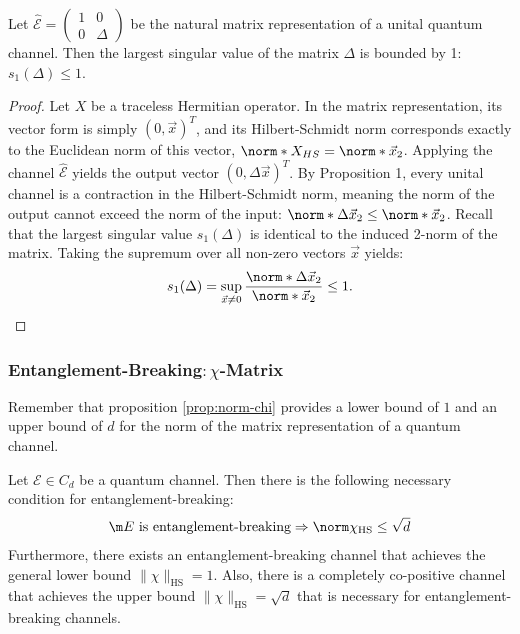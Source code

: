 \begin{prop}
Let $\hat{\mathcal{E}} = \begin{pmatrix} 1 & 0 \\ 0 & \Delta \end{pmatrix}$ be the natural matrix representation of a unital quantum channel. Then the largest singular value of the matrix $\Delta$ is bounded by 1: $s_1(\Delta) \leq 1$.
\end{prop}
\begin{proof}
Let $X$ be a traceless Hermitian operator. In the matrix representation, its vector form is simply $(0, \vec{x})^T$, and its Hilbert-Schmidt norm corresponds exactly to the Euclidean norm of this vector, $\norm*{X}_{HS} = \norm*{\vec{x}}_2$. Applying the channel $\hat{\mathcal{E}}$ yields the output vector $(0, \Delta \vec{x})^T$. By Proposition 1, every unital channel is a contraction in the Hilbert-Schmidt norm, meaning the norm of the output cannot exceed the norm of the input: $
\norm*{\Delta \vec{x}}_2 \leq \norm*{\vec{x}}_2$.
Recall that the largest singular value $s_1(\Delta)$ is identical to the induced 2-norm of the matrix. Taking the supremum over all non-zero vectors $\vec{x}$ yields:
\begin{align*}
s_1(\Delta) = \sup_{\vec{x} \neq 0} \frac{\norm*{\Delta \vec{x}}_2}{\norm*{\vec{x}}_2} \leq 1.
\end{align*}
\end{proof}



\subsubsection{Entanglement-Breaking$: \chi$-Matrix}
Remember that proposition \ref{prop:norm-chi} provides a lower bound of $1$ and an upper bound of $d$ for the norm of the matrix representation of a quantum channel.
\begin{prop}
Let $\mathcal{E} \in C_d$ be a quantum channel. Then there is the following necessary condition for entanglement-breaking:
\begin{align*}
    \m E \text{ is entanglement-breaking} \Rightarrow \norm \chi_\text{HS} \leq \sqrt{d}
\end{align*}
Furthermore, there exists an entanglement-breaking channel that achieves the general lower bound $\|\chi\|_{\text{HS}} = 1$. Also, there is a completely co-positive channel that achieves the upper bound $\|\chi\|_{\text{HS}} = \sqrt{d}$ that is necessary for entanglement-breaking channels. 
\end{prop}

